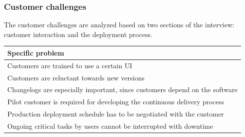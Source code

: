 \documentclass[english]{tktltiki2}
\theoremstyle{definition}
\theoremstyle{remark}
\begin{document}


\subsubsection{Customer challenges}
The customer challenges are analyzed based on two sections of the interview: customer interaction and the deployment process. 

\begin{center}
    \begin{tabular}{ | p{12cm} |}
    \hline
    \textbf{Specific problem} \\ \hline
    Customers are trained to use a certain UI \\ \hline
    Customers are reluctant towards new versions \\ \hline
    Changelogs are especially important, since customers depend on the software \\ \hline
    Pilot customer is required for developing the continuous delivery process \\ \hline
	Production deployment schedule has to be negotiated with the customer \\ \hline
	Ongoing critical tasks by users cannot be interrupted with downtime \\ 
    \hline
    \end{tabular}
\end{center}
\end{document}

